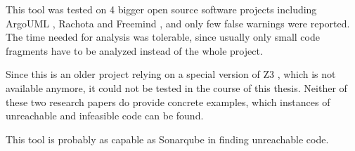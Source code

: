This tool was tested on 4 bigger open source software projects including ArgoUML \cite{ArgoUMLResourcesSite}, Rachota \cite{RachotaTimetracker} and Freemind \cite{MainPageFreeMind}, and only few false warnings were reported.
The time needed for analysis was tolerable, since usually only small code fragments have to be analyzed instead of the whole project.

Since this is an older project relying on a special version of Z3 \cite{demouraZ3EfficientSMT2008}, which is not available anymore, it could not be tested in the course of this thesis. Neither of these two research papers \cite{arltJoogieInfeasibleCode2012, arltJoogieJavaJimple2013} do provide concrete examples, which instances of unreachable and infeasible code can be found.

This tool is probably as capable as Sonarqube \cite{sonarqube} in finding unreachable code.

